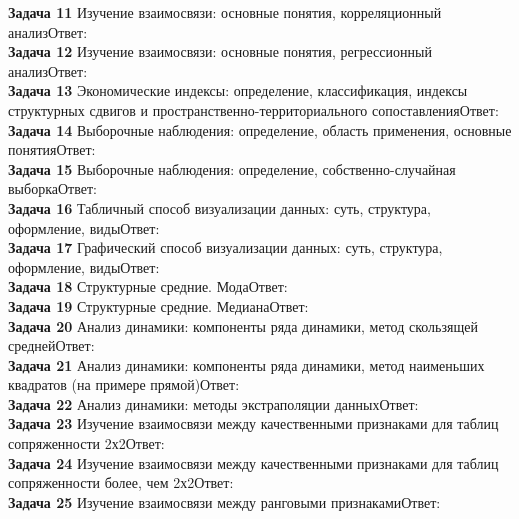 \documentclass{article}
\begin{document}
\textbf{Задача 11} Изучение взаимосвязи: основные понятия, корреляционный анализОтвет: \\

\textbf{Задача 12} Изучение взаимосвязи: основные понятия, регрессионный анализОтвет: \\

\textbf{Задача 13} Экономические индексы: определение, классификация, индексы структурных сдвигов и пространственно-территориального сопоставленияОтвет: \\

\textbf{Задача 14} Выборочные наблюдения: определение, область применения, основные понятияОтвет: \\

\textbf{Задача 15} Выборочные наблюдения: определение, собственно-случайная выборкаОтвет: \\

\textbf{Задача 16} Табличный способ визуализации данных: суть, структура, оформление, видыОтвет: \\

\textbf{Задача 17} Графический способ визуализации данных: суть, структура, оформление, видыОтвет: \\

\textbf{Задача 18} Структурные средние. МодаОтвет: \\

\textbf{Задача 19} Структурные средние. МедианаОтвет: \\

\textbf{Задача 20} Анализ динамики: компоненты ряда динамики, метод скользящей среднейОтвет: \\

\textbf{Задача 21} Анализ динамики: компоненты ряда динамики, метод наименьших квадратов (на примере прямой)Ответ: \\

\textbf{Задача 22} Анализ динамики: методы экстраполяции данныхОтвет: \\

\textbf{Задача 23} Изучение взаимосвязи между качественными признаками для таблиц сопряженности 2х2Ответ: \\

\textbf{Задача 24} Изучение взаимосвязи между качественными признаками для таблиц сопряженности более, чем 2х2Ответ: \\

\textbf{Задача 25} Изучение взаимосвязи между ранговыми признакамиОтвет: \\
\end{document}

